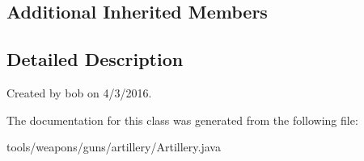 \subsection*{Additional Inherited Members}


\subsection{Detailed Description}
Created by bob on 4/3/2016. 

The documentation for this class was generated from the following file\+:\begin{DoxyCompactItemize}
\item 
tools/weapons/guns/artillery/Artillery.\+java\end{DoxyCompactItemize}
